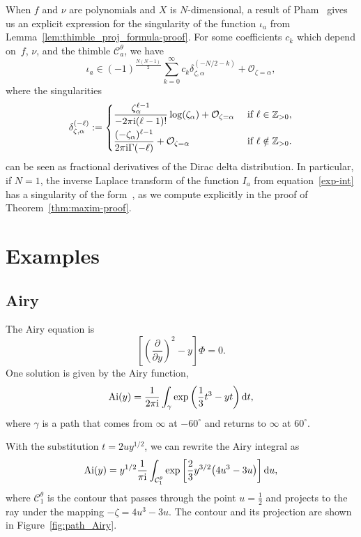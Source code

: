\documentclass[10pt,a4paper]{amsart}
\newcommand{\Z}{\mathbb{Z}}
\DeclareMathOperator{\Ai}{Ai}
\numberwithin{equation}{section}
\begin{document}
\begin{Remark}\label{rmk:Pham formula}
When $f$ and $\nu$ are polynomials and $X$ is $N$-dimensional, a result of Pham~\cite[equation~(2.4), 2\`{e}me Partie]{pham} gives us an explicit expression for the singularity of the function $\iota_a$ from Lemma~\ref{lem:thimble_proj_formula-proof}. For some coefficients $c_k$ which depend on~$f$, $\nu$, and the thimble $\mathcal{C}_a^\theta$, we have
\[%
\iota_a \in (-1)^{\frac{N(N-1)}{2}} \sum_{k=0}^\infty c_k \delta_{\zeta, \alpha}^{(-N/2 - k)} + \mathcal{O}_{\zeta = \alpha},
\]
where the singularities
\begin{equation*}
\delta_{\zeta,\alpha}^{(-\ell)}:=\begin{cases}
\displaystyle\frac{\zeta_\alpha^{\ell-1}}{-2 \pi {\rm i}(\ell-1)!}\log(\zeta_\alpha)+ \mathcal{O}_{\zeta = \alpha} & \text{ if } \ell \in \Z_{> 0},\vspace{1mm}\\
\displaystyle\frac{(-\zeta_\alpha)^{\ell-1}}{2 \pi {\rm i} \Gamma(-\ell)}+ \mathcal{O}_{\zeta = \alpha} & \text{ if } \ell \notin \Z_{> 0} .
\end{cases}
\end{equation*}
can be seen as fractional derivatives of the Dirac delta distribution. In particular, if $N=1$, the inverse Laplace transform of the function $I_a$ from equation~\eqref{exp-int} has a singularity of the form~, as we compute explicitly in the proof of Theorem~\ref{thm:maxim-proof}.
\end{Remark}
\section{Examples}\label{sec:examples}
%
\subsection{Airy}\label{sec:airy}
%
The Airy equation is
\[
\left[\left(\frac{\partial}{\partial y}\right)^2 - y\right] \Phi = 0.
\]
One solution is given by the Airy function,
\[ \Ai(y) = \frac{1}{2 \pi {\rm i}} \int_\gamma \exp\left(\frac{1}{3}t^3 - yt\right) {\rm d}t, \]
where $\gamma$ is a path that comes from $\infty$ at $-60^\circ$ and returns to $\infty$ at $60^\circ$.

With the substitution $t = 2uy^{1/2}$, we can rewrite the Airy integral as
\begin{equation}\label{eqn:airy-distillation}
\Ai(y) = y^{1/2} \frac{1}{ \pi {\rm i}} \int_{\mathcal{C}^\theta_1} \exp\left[\frac{2}{3}y^{3/2} \bigl(4u^3 - 3u\bigr)\right] {\rm d}u,
\end{equation}
where $\mathcal{C}^\theta_1$ is the contour that passes through the point $u = \frac{1}{2}$ and projects to the ray  under the mapping $-\zeta = 4u^3 - 3u$. The contour and its projection are shown in Figure~\ref{fig:path_Airy}.
\end{document}
